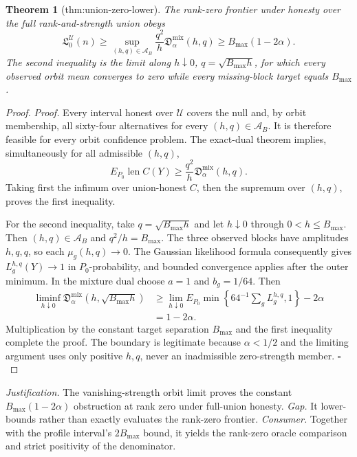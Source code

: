 \documentclass{article}
\newtheorem{theorem}{Theorem}
\begin{document}
\begin{theorem}[thm:union-zero-lower]\label{thm:union-zero-lower}
The rank-zero frontier under honesty over the full rank-and-strength union obeys \[\mathfrak L_{0}^{\mathcal U}(n)\ge\sup_{(h,q)\in\mathcal A_B}\frac{q^2}{h}\mathfrak D_{\alpha}^{\mathrm{mix}}(h,q)\ge B_{\max}(1-2\alpha).\] The second inequality is the limit along \(h\downarrow0\), \(q=\sqrt{B_{\max}h}\), for which every observed orbit mean converges to zero while every missing-block target equals \(B_{\max}\).
\end{theorem}
\begin{proof}
\textit{Proof.}
Every interval honest over \(\mathcal U\) covers the null and, by orbit
membership, all sixty-four alternatives for every
\((h,q)\in\mathcal A_B\).  It is therefore feasible for every orbit confidence
problem.  The exact-dual theorem implies, simultaneously for all admissible
\((h,q)\),
\[
E_{P_0}\operatorname{len}C(Y)
\geq\frac{q^2}{h}\mathfrak D_\alpha^{\mathrm{mix}}(h,q).
\]
Taking first the infimum over union-honest \(C\), then the supremum over
\((h,q)\), proves the first inequality.

For the second inequality, take \(q=\sqrt{B_{\max}h}\) and let
\(h\downarrow0\) through \(0<h\leq B_{\max}\).  Then
\((h,q)\in\mathcal A_B\) and \(q^2/h=B_{\max}\).  The three observed blocks
have amplitudes \(h,q,q\), so each \(\mu_g(h,q)\to0\).  The Gaussian
likelihood formula consequently gives \(L_g^{h,q}(Y)\to1\) in
\(P_0\)-probability, and bounded convergence applies after the outer minimum.
In the mixture dual choose \(a=1\) and \(b_g=1/64\).  Then
\[
\begin{split}
\liminf_{h\downarrow0}
\mathfrak D_\alpha^{\mathrm{mix}}(h,\sqrt{B_{\max}h})
&\geq
\lim_{h\downarrow0}E_{P_0}\min\left\{64^{-1}\sum_gL_g^{h,q},1\right\}
-2\alpha\\
&=1-2\alpha.
\end{split}
\]
Multiplication by the constant target separation \(B_{\max}\) and the first
inequality complete the proof.  The boundary is legitimate because
\(\alpha<1/2\) and the limiting argument uses only positive \(h,q\), never an
inadmissible zero-strength member. \(\square\)
\end{proof}
\par\smallskip\noindent \textit{Justification.} The vanishing-strength orbit limit proves the constant \(B_{\max}(1-2\alpha)\) obstruction at rank zero under full-union honesty. \textit{Gap.} It lower-bounds rather than exactly evaluates the rank-zero frontier. \textit{Consumer.} Together with the profile interval's \(2B_{\max}\) bound, it yields the rank-zero oracle comparison and strict positivity of the denominator.
\end{document}
